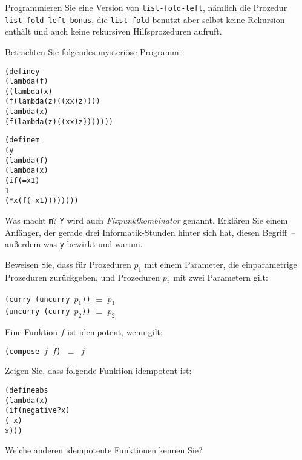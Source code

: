 \begin{aufgabe}
  Programmieren Sie eine Version von
  \texttt{list-fold-left}, nämlich die Prozedur
  \texttt{list-fold-left-bonus}, die \texttt{list-fold} benutzt aber
  selbst keine Rekursion enthält und auch keine rekursiven
  Hilfsprozeduren aufruft.
\end{aufgabe}


\begin{aufgabe}
  Betrachten Sie folgendes mysteriöse Programm:
  \begin{alltt}
(define y
  (lambda (f)
    ((lambda (x)
       (f (lambda (z) ((x x) z))))
     (lambda (x)
       (f (lambda (z) ((x x) z)))))))

(define m
  (y
   (lambda (f)
     (lambda (x)
       (if (= x 1)
           1
           (* x (f (- x 1))))))))
   \end{alltt}
   Was macht \texttt{m}?  \texttt{Y} wird auch
   \textit{Fixpunktkombinator} genannt.  Erklären Sie einem Anfänger, der
   gerade drei Informatik-Stunden hinter sich hat, diesen Begriff~--
   außerdem was
   \texttt{y} bewirkt und warum.
 \end{aufgabe}

\begin{aufgabe}
  Beweisen Sie, dass für Prozeduren $p_1$ mit einem Parameter, die
  einparametrige Prozeduren zurückgeben, und Prozeduren $p_2$ mit zwei
  Parametern gilt:
  \begin{center}
    \texttt{(curry (uncurry $p_1$))} $\equiv$ $p_1$\\
    \texttt{(uncurry (curry $p_2$))} $\equiv$ $p_2$
  \end{center}
 \end{aufgabe}

\begin{aufgabe}
  Eine Funktion $f$ ist idempotent, wenn gilt:

  \begin{center}
    \texttt{(compose $f$ $f$) $\equiv$ $f$}
  \end{center}

  Zeigen Sie, dass folgende Funktion idempotent ist:

  \begin{alltt}
    (define abs
      (lambda (x)
         (if (negative? x)
             (- x)
             x)))  \end{alltt}

  Welche anderen idempotente Funktionen kennen Sie?
\end{aufgabe}

